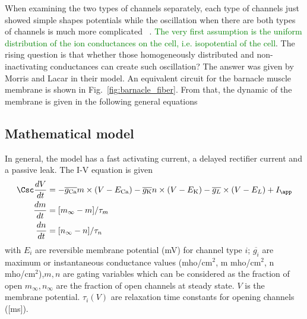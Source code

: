 When examining the two types of channels separately, each type of
channels just showed simple shapes potentials while the oscillation
when there are both types of channels is much more complicated
~\citep{morris1981vob}.
\textcolor{green}{The very first assumption is the uniform distribution
  of the ion conductances on the cell, i.e. isopotential of the cell}.
The rising question is that whether those homogeneously distributed
and non-inactivating conductances can create such oscillation?  The
answer was given by Morris and Lacar in their model.  An equivalent
circuit for the barnacle muscle membrane is shown in
Fig.~\ref{fig:barnacle_fiber}.  From that, the dynamic of the membrane
is given in the following general equations


\subsection{Mathematical model}
\label{sec:mathematical-model-6}

In general, the model has a fast activating  current, a
delayed rectifier  current and a passive leak. The I-V
equation is given
\begin{equation}
  \label{eq:54}
  \begin{split}
    \Csc\frac{dV}{dt} &= -\overline{g_{\ce{Ca}}} m\times (V-E_{\ce{Ca}}) -
    \overline{g_{\ce{K}}} n \times (V - E_{\ce{K}}) - \overline{g_L} \times(V-E_L) + I_\app \\
    \frac{dm}{dt} &= [m_\infty - m]/\tau_m \\
  \frac{dn}{dt} &= [n_\infty - n]/\tau_n
  \end{split}
\end{equation}
with $E_i$ are reversible membrane potential (mV) for channel type
$i$; $\overline{g_i}$ are maximum or instantaneous conductance values
(mho/cm$^2$, m mho/cm$^2$, n mho/cm$^2$),$m,n$ are gating variables
which can be considered as the fraction of open $m_\infty, n_\infty$
are the fraction of open channels at steady state. $V$ is the membrane
potential. $\tau_i(V)$ are relaxation time constants for opening
channels ([ms]).

